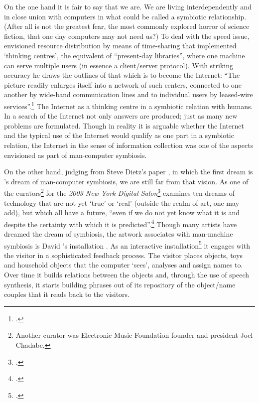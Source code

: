 On the one hand it is fair to say that we are. We are living interdependently and in close union with computers in what could be called a symbiotic relationship. (After all is not the greatest fear, the most commonly explored horror of science fiction, that one day computers may not need us?) To deal with the speed issue, \citeauthor{licklider60} envisioned resource distribution by means of time-sharing that implemented `thinking centres', the equivalent of ``present-day libraries'', where one machine can serve multiple users (in essence a client/server protocol). With striking accuracy he draws the outlines of that which is to become the Internet: ``The picture readily enlarges itself into a network of such centers, connected to one another by wide-band communication lines and to individual users by leased-wire services''.\footcite[Section 5.1]{licklider60} The Internet as a thinking centre in a symbiotic relation with humans. In a search of the Internet not only answers are produced; just as many new problems are formulated. Though in reality it is arguable whether the Internet and the typical use of the Internet would qualify as one part in a symbiotic relation, the Internet in the sense of information collection was one of the aspects \citeauthor{licklider60} envisioned as part of man-computer symbiosis.

On the other hand, judging from Steve Dietz's paper , in which the first dream is \citeauthor{licklider60}'s dream of man-computer symbiosis, we are still far from that vision. As one of the curators\footnote{Another curator was Electronic Music Foundation founder and president Joel Chadabe.} for the \emph{2003 New York Digital Salon}\footcite{digitalsalon03} \citeauthor{dietz02} examines ten dreams of technology that are not yet `true' or `real' (outside the realm of art, one may add), but which all have a future, ``even if we do not yet know what it is and despite the certainty with which it is predicted''.\footcite{dietz02} \hypertarget{sec:target:interaction-symbiosis}{Though many artists} have dreamed the dream of symbiosis, the artwork \citeauthor{dietz02} associates with man-machine symbiosis is David \citeauthor{rokeby91}'s installation . As an interactive installation\footcite[For an introduction and description of the work, see][]{rokeby91} it engages with the visitor in a sophisticated feedback process. The visitor places objects, toys and household objects that the computer `sees', analyses and assign names to. Over time it builds relations between the objects and, through the use of speech synthesis, it starts building phrases out of its repository of the object/name couples that it reads back to the visitors.


